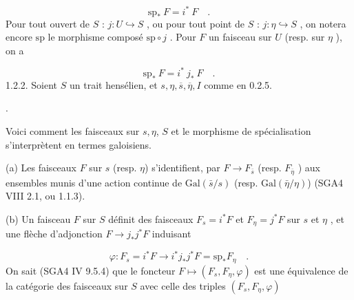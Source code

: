 \begin{equation}\tag{1.2.1.1}
\mathrm{sp}_* \ F = i^* \ F \quad .
\end{equation}
Pour tout ouvert de $S$ : $j : U \hookrightarrow S$ , ou pour tout point de $S$ : $j : \eta \hookrightarrow S$ , on notera encore $\mathrm{sp}$ le morphisme composé $\mathrm{sp} \circ j$ . Pour $F$ un faisceau sur $U$ (resp. sur $\eta$ ), on a

\begin{equation}\tag{1.2.1.2}
\mathrm{sp}_* \ F = i^* \ j_* \ F \quad .
\end{equation}
1.2.2. Soient $S$ un trait hensélien, et $s, \eta, \overline{s}, \overline{\eta}, I$ comme en 0.2.5.

\begin{center}
\quad .
\end{center}


Voici comment les faisceaux sur $s,\eta$, $S$ et le morphisme de spécialisation s'interprètent en termes galoisiens.

(a) Les faisceaux $F$ sur $s$ (resp. $\eta$) s'identifient, par $F \longrightarrow F_{\bar{s}}$ (resp. $F_{\bar{\eta}}$ ) aux ensembles munis d'une action continue de $\mathrm{Gal}(\bar{s}/s)$ (resp. $\mathrm{Gal}(\bar{\eta}/\eta)$) (SGA4 VIII 2.1, ou 1.1.3).

(b) Un faisceau $F$ sur $S$ définit des faisceaux $F_s = i^* F$ et $F_\eta = j^* F$ sur $s$ et $\eta$ , et une flèche d'adjonction $F \longrightarrow j_* j^* F$ induisant

\begin{equation*}
\varphi : F_s = i^* F \longrightarrow i^* j_* j^* F = \mathrm{sp}_* F_\eta \quad .
\end{equation*}
On sait (SGA4 IV 9.5.4) que le foncteur $F \longmapsto (F_s, F_\eta, \varphi)$ est une équivalence de la catégorie des faisceaux sur $S$ avec celle des triples $(F_s, F_\eta, \varphi)$

